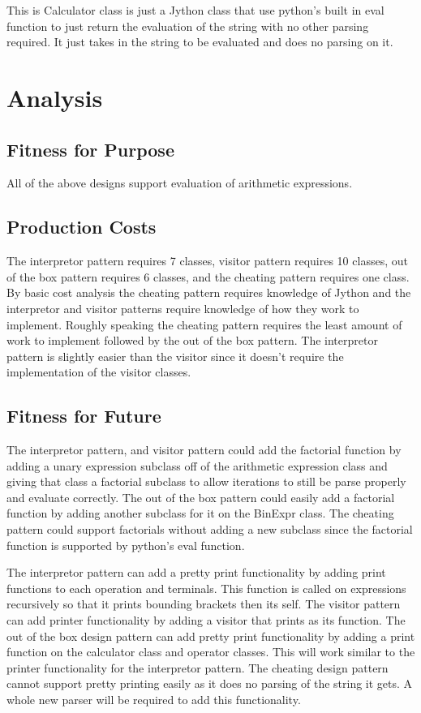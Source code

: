 \documentclass{article}
\begin{document}
This is Calculator class is just a Jython class that use python's built in eval function to just return the evaluation of the string with no other parsing required. It just takes in the string to be evaluated and does no parsing on it.

\newpage

\section*{Analysis} %
\label{sec:analysis}
\subsection*{Fitness for Purpose} %
\label{sub:fitness_for_purpose}
All of the above designs support evaluation of arithmetic expressions.
\subsection*{Production Costs} %
\label{sub:production_costs}
The interpretor pattern requires 7 classes, visitor pattern requires 10 classes, out of the box pattern requires 6 classes, and the cheating pattern requires one class. By basic cost analysis the cheating pattern requires knowledge of Jython and the interpretor and visitor patterns require knowledge of how they work to implement. Roughly speaking the cheating pattern requires the least amount of work to implement followed by the out of the box pattern. The interpretor pattern is slightly easier than the visitor since it doesn't require the implementation of the visitor classes.
\subsection*{Fitness for Future} %
\label{sub:fitness_for_future}
The interpretor pattern, and visitor pattern could add the factorial function by adding a unary expression subclass off of the arithmetic expression class and giving that class a factorial subclass to allow iterations to still be parse properly and evaluate correctly. The out of the box pattern could easily add a factorial function by adding another subclass for it on the BinExpr class. The cheating pattern could support factorials without adding a new subclass since the factorial function is supported by python's eval function.

The interpretor pattern can add a pretty print functionality by adding print functions to each operation and terminals. This function is called on expressions recursively so that it prints bounding brackets then its self. The visitor pattern can add printer functionality by adding a visitor that prints as its function. The out of the box design pattern can add pretty print functionality by adding  a print function on the calculator class and operator classes. This will work similar to the printer functionality for the interpretor pattern. The cheating design pattern cannot support pretty printing easily as it does no parsing of the string it gets. A whole new parser will be required to add this functionality.
\end{document}
